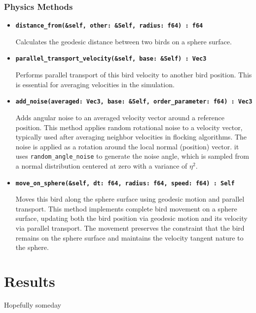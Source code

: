 \documentclass[12pt,a4paper]{article}
\begin{document}
\subsubsection{Physics Methods}
\begin{itemize}
    \item \textbf{\texttt{distance\_from(\&self, other: \&Self, radius: f64) : f64}}
    
    Calculates the geodesic distance between two birds on a sphere surface.
    \item \textbf{\texttt{parallel\_transport\_velocity(\&self, base: \&Self) : Vec3}}
    
    Performs parallel transport of this bird velocity to another bird position. This is essential for averaging velocities in the simulation.

    \item \textbf{\texttt{add\_noise(averaged: Vec3, base: \&Self, order\_parameter: f64) : Vec3}}
    
    Adds angular noise to an averaged velocity vector around a reference position. This method applies random rotational noise to a velocity vector, typically used after averaging neighbor velocities in flocking algorithms. The noise is applied as a rotation around the local normal (position) vector. it uses \texttt{random\_angle\_noise} to generate the noise angle, which is sampled from a normal distribution centered at zero with a variance of \(\eta^2\).

    \item \textbf{\texttt{move\_on\_sphere(\&self, dt: f64, radius: f64, speed: f64) : Self}}
    
    Moves this bird along the sphere surface using geodesic motion and parallel transport. This method implements complete bird movement on a sphere surface, updating both the bird position via geodesic motion and its velocity via parallel transport. The movement preserves the constraint that the bird remains on the sphere surface and maintains the velocity tangent nature to the sphere.
\end{itemize}

\section{Results}
Hopefully someday



\end{document}
